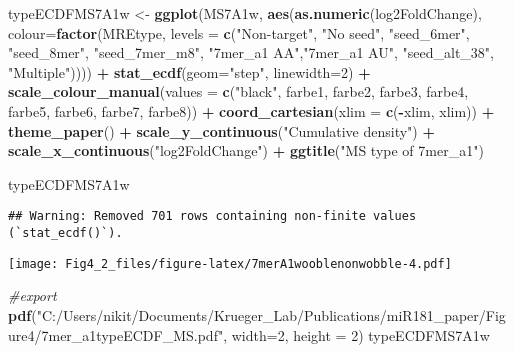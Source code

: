 \documentclass[
]{article}
\newenvironment{Shaded}{\begin{snugshade}}{\end{snugshade}}
\newcommand{\AttributeTok}[1]{\textcolor[rgb]{0.13,0.29,0.53}{#1}}
\newcommand{\CommentTok}[1]{\textcolor[rgb]{0.56,0.35,0.01}{\textit{#1}}}
\newcommand{\DecValTok}[1]{\textcolor[rgb]{0.00,0.00,0.81}{#1}}
\newcommand{\FunctionTok}[1]{\textcolor[rgb]{0.13,0.29,0.53}{\textbf{#1}}}
\newcommand{\NormalTok}[1]{#1}
\newcommand{\OtherTok}[1]{\textcolor[rgb]{0.56,0.35,0.01}{#1}}
\newcommand{\SpecialCharTok}[1]{\textcolor[rgb]{0.81,0.36,0.00}{\textbf{#1}}}
\newcommand{\StringTok}[1]{\textcolor[rgb]{0.31,0.60,0.02}{#1}}
\begin{document}
\begin{Shaded}
\begin{Highlighting}[]
\NormalTok{typeECDFMS7A1w }\OtherTok{\textless{}{-}} \FunctionTok{ggplot}\NormalTok{(MS7A1w, }\FunctionTok{aes}\NormalTok{(}\FunctionTok{as.numeric}\NormalTok{(log2FoldChange), }
                              \AttributeTok{colour=}\FunctionTok{factor}\NormalTok{(MREtype, }\AttributeTok{levels =} \FunctionTok{c}\NormalTok{(}\StringTok{"Non{-}target"}\NormalTok{, }\StringTok{"No seed"}\NormalTok{, }\StringTok{"seed\_6mer"}\NormalTok{, }\StringTok{"seed\_8mer"}\NormalTok{, }\StringTok{"seed\_7mer\_m8"}\NormalTok{, }\StringTok{"7mer\_a1 AA"}\NormalTok{,}\StringTok{"7mer\_a1 AU"}\NormalTok{, }\StringTok{"seed\_alt\_38"}\NormalTok{, }\StringTok{"Multiple"}\NormalTok{)))) }\SpecialCharTok{+} 
  \FunctionTok{stat\_ecdf}\NormalTok{(}\AttributeTok{geom=}\StringTok{"step"}\NormalTok{, }\AttributeTok{linewidth=}\DecValTok{2}\NormalTok{) }\SpecialCharTok{+}
  \FunctionTok{scale\_colour\_manual}\NormalTok{(}\AttributeTok{values =} \FunctionTok{c}\NormalTok{(}\StringTok{"black"}\NormalTok{, farbe1, farbe2, farbe3, farbe4, farbe5, farbe6, farbe7, farbe8)) }\SpecialCharTok{+}
  \FunctionTok{coord\_cartesian}\NormalTok{(}\AttributeTok{xlim =} \FunctionTok{c}\NormalTok{(}\SpecialCharTok{{-}}\NormalTok{xlim, xlim)) }\SpecialCharTok{+} 
  \FunctionTok{theme\_paper}\NormalTok{() }\SpecialCharTok{+}
  \FunctionTok{scale\_y\_continuous}\NormalTok{(}\StringTok{"Cumulative density"}\NormalTok{) }\SpecialCharTok{+} \FunctionTok{scale\_x\_continuous}\NormalTok{(}\StringTok{"log2FoldChange"}\NormalTok{) }\SpecialCharTok{+}
  \FunctionTok{ggtitle}\NormalTok{(}\StringTok{"MS type of 7mer\_a1"}\NormalTok{)}

\NormalTok{typeECDFMS7A1w}
\end{Highlighting}
\end{Shaded}

\begin{verbatim}
## Warning: Removed 701 rows containing non-finite values (`stat_ecdf()`).
\end{verbatim}

\texttt{[image: Fig4\_2\_files/figure-latex/7merA1wooblenonwobble-4.pdf]}

\begin{Shaded}
\begin{Highlighting}[]
\CommentTok{\#export}
\FunctionTok{pdf}\NormalTok{(}\StringTok{"C:/Users/nikit/Documents/Krueger\_Lab/Publications/miR181\_paper/Figure4/7mer\_a1typeECDF\_MS.pdf"}\NormalTok{, }\AttributeTok{width=}\DecValTok{2}\NormalTok{, }\AttributeTok{height =} \DecValTok{2}\NormalTok{)}
\NormalTok{typeECDFMS7A1w}
\end{Highlighting}
\end{Shaded}
\end{document}
